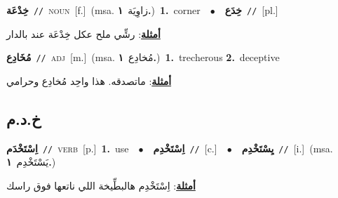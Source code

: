 \documentclass[10pt,a4paper,twoside]{article} %
\begin{document}
\begin{multicols}{2}
{\setlength\topsep{0pt}\textbf{\foreignlanguage{arabic}{خِدْعَة}}\ {\color{gray}\texttt{//}\color{black}}\ \textsc{noun}\ [f.]\ \color{gray}(msa. \foreignlanguage{arabic}{زاوِيَة}~\foreignlanguage{arabic}{\textbf{١.}})\color{black}\ \textbf{1.}~corner\ \ $\bullet$\ \ \setlength\topsep{0pt}\textbf{\foreignlanguage{arabic}{خِدَع}}\ {\color{gray}\texttt{//}\color{black}}\ [pl.]\  \begin{flushright}\color{gray}\foreignlanguage{arabic}{\textbf{\underline{\foreignlanguage{arabic}{أمثلة}}}: رشِّي ملح عكل خِدْعَة عند بالدار}\end{flushright}\color{black}} \vspace{2mm}

{\setlength\topsep{0pt}\textbf{\foreignlanguage{arabic}{مُخَادِع}}\ {\color{gray}\texttt{//}\color{black}}\ \textsc{adj}\ [m.]\ \color{gray}(msa. \foreignlanguage{arabic}{مُخادِع}~\foreignlanguage{arabic}{\textbf{١.}})\color{black}\ \textbf{1.}~trecherous  \textbf{2.}~deceptive\  \begin{flushright}\color{gray}\foreignlanguage{arabic}{\textbf{\underline{\foreignlanguage{arabic}{أمثلة}}}: ماتصدقه. هذا واحِد مُخادِع وحرامي}\end{flushright}\color{black}} \vspace{2mm}

\vspace{-3mm}
\subsection*{\color{blue}\foreignlanguage{arabic}{خ.د.م}\color{blue}{}} 

{\setlength\topsep{0pt}\textbf{\foreignlanguage{arabic}{اِسْتَخْدَم}}\ {\color{gray}\texttt{//}\color{black}}\ \textsc{verb}\ [p.]\ \textbf{1.}~use\ \ $\bullet$\ \ \setlength\topsep{0pt}\textbf{\foreignlanguage{arabic}{اِسْتَخْدِم}}\ {\color{gray}\texttt{//}\color{black}}\ [c.]\ \ $\bullet$\ \ \setlength\topsep{0pt}\textbf{\foreignlanguage{arabic}{يِسْتَخْدِم}}\ {\color{gray}\texttt{//}\color{black}}\ [i.]\ \color{gray}(msa. \foreignlanguage{arabic}{يَسْتَخْدِم}~\foreignlanguage{arabic}{\textbf{١.}})\color{black}\  \begin{flushright}\color{gray}\foreignlanguage{arabic}{\textbf{\underline{\foreignlanguage{arabic}{أمثلة}}}: اِسْتَخْدِم هالبطِّيخة اللي ناتعها فوق راسك}\end{flushright}\color{black}} \vspace{2mm}


\end{multicols}
\end{document}
